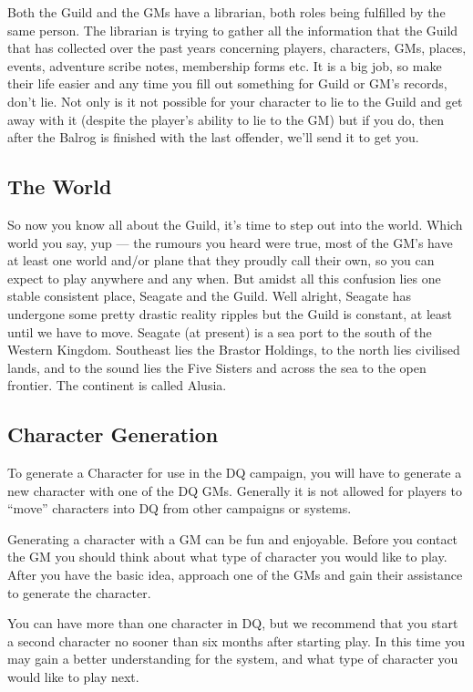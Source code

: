 \documentclass[twoside,a4paper]{article}
\begin{document}
\begin{multicols}{2}
Both the Guild and the GMs have a librarian, both roles being
fulfilled by the same person.  The librarian is trying to gather all
the information that the Guild that has collected over the past years
concerning players, characters, GMs, places, events, adventure scribe
notes, membership forms etc.  It is a big job, so make their life
easier and any time you fill out something for Guild or GM's records,
don't lie.  Not only is it not possible for your character to lie to
the Guild and get away with it (despite the player's ability to lie to
the GM) but if you do, then after the Balrog is finished with the last
offender, we'll send it to get you.

\subsection{The World}

So now you know all about the Guild, it's time to step out into the
world.  Which world you say, yup --- the rumours you heard were true,
most of the GM's have at least one world and/or plane that they
proudly call their own, so you can expect to play anywhere and any
when.  But amidst all this confusion lies one stable consistent place,
Seagate and the Guild.  Well alright, Seagate has undergone some
pretty drastic reality ripples but the Guild is constant, at least
until we have to move. Seagate (at present) is a sea port to the south
of the Western Kingdom.  Southeast lies the Brastor Holdings, to the
north lies civilised lands, and to the sound lies the Five Sisters and
across the sea to the open frontier.  The continent is called Alusia.

\subsection{Character Generation}

To generate a Character for use in the DQ campaign, you will have to
generate a new character with one of the DQ GMs. Generally it is not
allowed for players to ``move'' characters into DQ from other campaigns
or systems.

Generating a character with a GM can be fun and enjoyable. Before you
contact the GM you should think about what type of character you would
like to play. After you have the basic idea, approach one of the GMs
and gain their assistance to generate the character.

You can have more than one character in DQ, but we recommend that you
start a second character no sooner than six months after starting
play. In this time you may gain a better understanding for the system,
and what type of character you would like to play next.


\end{multicols}
\end{document}
